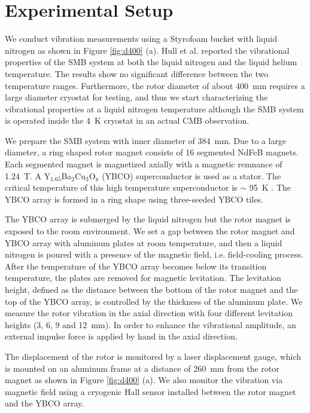 \documentclass[a4paper,11pt]{jpconf}
\begin{document}
\section{Experimental Setup}


We conduct vibration measurements using a Styrofoam bucket with liquid nitrogen as shown in Figure \ref{fig:d400} (a). 
Hull et al. reported the vibrational properties of the SMB system at both the liquid nitrogen and the liquid helium temperature. 
The results show no significant difference between the two temperature ranges. 
Furthermore, the rotor diameter of about 400~mm requires a large diameter cryostat for testing, and thus we start characterizing the vibrational properties at a liquid nitrogen temperature although the SMB system is operated inside the 4~K cryostat in an actual CMB observation.

We prepare the SMB system with inner diameter of 384~mm.
Due to a large diameter, a ring shaped rotor magnet consists of 16 segmented NdFeB magnets.
Each segmented magnet is magnetized axially with a magnetic remnance of 1.24~T.
A Y$_{1.65}$Ba$_{2}$Cu$_{3}$O$_{\mathrm{x}}$ (YBCO) superconductor is used as a stator.
The critical temperature of this high temperature superconductor is $\sim$ 95~K \cite{Hull}.
The YBCO array is formed in a ring shape using three-seeded YBCO tiles.

The YBCO array is submerged by the liquid nitrogen but the rotor magnet is exposed to the room environment.
We set a gap between the rotor magnet and YBCO array with aluminum plates at room temperature, and then a liquid nitrogen is poured with a presence of the magnetic field, i.e. field-cooling process.
After the temperature of the YBCO array becomes below its transition temperature, the plates are removed for magnetic levitation.
The levitation height, defined as the distance between the bottom of the rotor magnet and the top of the YBCO array, is controlled by the thickness of the aluminum plate.
We measure the rotor vibration in the axial direction with four different levitation heights (3, 6, 9 and 12~mm).
In order to enhance the vibrational amplitude, an external impulse force is applied by hand in the axial direction.

The displacement of the rotor is monitored by a laser displacement gauge,
which is mounted on an aluminum frame at a distance of 260~mm from the rotor magnet as shown in Figure \ref{fig:d400} (a).
We also monitor the vibration via magnetic field using a cryogenic Hall sensor installed between the rotor magnet and the YBCO array.
\end{document}

